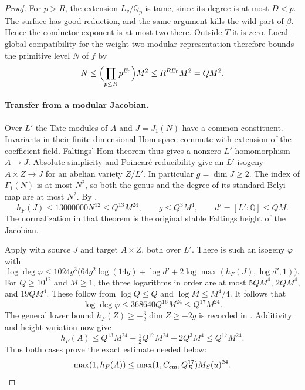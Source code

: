 \documentclass[11pt]{article}
\theoremstyle{definition}
\theoremstyle{remark}
\newcommand{\Q}{\mathbb Q}
\begin{document}
\begin{proof}
For $p>R$, the extension $L_v/\Q_p$ is tame, since its
degree is at most $D<p$. The surface has good reduction,
and the same argument kills the wild part of $\beta$.
Hence the conductor exponent is at most two there.
Outside $T$ it is zero. Local--global compatibility for the
weight-two modular representation therefore bounds the
primitive level $N$ of $f$ by
\[
 N\le\Bigl(\prod_{p\le R}p^{E_0}\Bigr)M^2
      \le R^{RE_0}M^2=QM^2.
\]

\paragraph{Transfer from a modular Jacobian.}
Over $L'$ the Tate modules of $A$ and $J=J_1(N)$ have a common
constituent. Invariants in their finite-dimensional Hom space
commute with extension of the coefficient field. Faltings'
Hom theorem thus gives a nonzero $L'$-homomorphism $A\to J$.
Absolute simplicity and Poincar\'e reducibility give an
$L'$-isogeny $A\times Z\to J$ for an abelian variety $Z/L'$.
In particular $g=\dim J\ge2$.
The index of $\Gamma_1(N)$ is at most $N^2$, so both the
genus and the degree of its standard Belyi map are at most
$N^2$. By \cite[Theorem 1.1.1 and Section 2.3]{javanpeykar},
\[
 h_F(J)\le13000000N^{12}\le Q^{13}M^{24},\qquad
 g\le Q^3M^4,\qquad d'=[L':\Q]\le QM.
\]
The normalization in that theorem is the original stable
Faltings height of the Jacobian.

Apply \cite[Theorem 1.4]{gr2014} with source $J$ and target
$A\times Z$, both over $L'$. There is such an isogeny $\varphi$
with
\[
 \log\deg\varphi\le1024g^3
 \bigl(64g^2\log(14g)+\log d'
    +2\log\max(h_F(J),\log d',1)\bigr).
\]
For $Q\ge10^{12}$ and $M\ge1$, the three logarithms in order
are at most $5QM^4$, $2QM^4$, and $19QM^4$.
These follow from $\log Q\le Q$ and $\log M\le M^4/4$.
It follows that
\[
 \log\deg\varphi\le368640Q^{16}M^{24}
                       \le Q^{17}M^{24}.
\]
The general lower bound $h_F(Z)\ge-\tfrac32\dim Z\ge-2g$
is recorded in \cite[Section 9]{gr2014}.
Additivity and height variation now give
\[
 h_F(A)\le Q^{13}M^{24}+\tfrac12Q^{17}M^{24}+2Q^3M^4
          \le Q^{17}M^{24}.
\]
Thus both cases prove the exact estimate needed below:
\[
 \max(1,h_F(A))
      \le\max(1,C_{\rm cm},Q_R^{17})M_S(u)^{24}.
\]



\end{proof}
\end{document}
